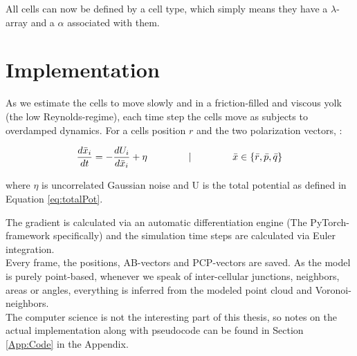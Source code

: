 All cells can now be defined by a cell type, which simply means they have a $\lambda$-array and a $\alpha$ associated with them.\\


\section{Implementation}
As we estimate the cells to move slowly and in a friction-filled and viscous yolk (the low Reynolds-regime), each time step the cells move as subjects to overdamped dynamics. For a cells position $r$ and the two polarization vectors, :

\begin{equation}
    \frac{d \bar{x}_i}{d t}=-\frac{d U_i}{d \bar{x}_i}+\eta \hspace{1.5cm}|\hspace{1.5cm}  \bar{x} \in \{\bar{r}, \bar{p}, \bar{q}\}
\end{equation}

where $\eta$ is uncorrelated Gaussian noise and U is the total potential as defined in Equation \ref{eq:totalPot}.

The gradient is calculated via an automatic differentiation engine (The PyTorch-framework specifically) and the simulation time steps are calculated via Euler integration.\\

Every frame, the positions, AB-vectors and PCP-vectors are saved. As the model is purely point-based, whenever we speak of inter-cellular junctions, neighbors, areas or angles, everything is inferred from the modeled point cloud and Voronoi-neighbors. \\

The computer science is not the interesting part of this thesis, so notes on the actual implementation along with pseudocode can be found in Section \ref{App:Code} in the Appendix.

